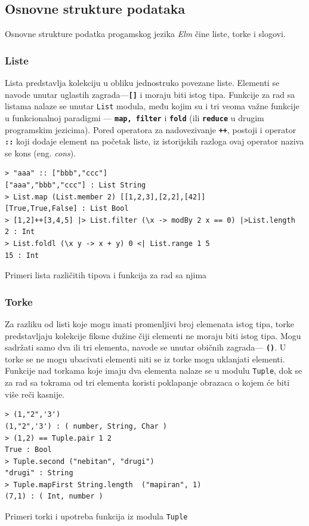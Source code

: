 \documentclass[12pt,oneside]{memoir}
\begin{document}
\subsection{Osnovne strukture podataka}
Osnovne strukture podatka progamskog jezika \emph{Elm} čine liste, torke i slogovi. 
\subsubsection{Liste}
Lista predstavlja kolekciju u obliku jednostruko povezane liste. Elementi se navode
unutar uglastih zagrada---\textbf{\texttt{[\smallskip ]}} i moraju biti istog tipa. Funkcije za rad
sa listama nalaze se unutar \texttt{List} modula, među kojim su i tri veoma važne funkcije 
u funkcionalnoj paradigmi --- \textbf{\texttt{map, filter}} i \textbf{\texttt{fold}} (ili
\textbf{\texttt{reduce}} u drugim programskim jezicima).
Pored operatora za nadovezivanje \textbf{\texttt{++}}, postoji i operator \textbf{\texttt{::}} koji
dodaje element na početak liste, iz istorijskih razloga ovaj operator naziva se kons
(eng. \emph{cons}). 
\begin{listing}[h]
\begin{verbatim}
> "aaa" :: ["bbb","ccc"]
["aaa","bbb","ccc"] : List String
> List.map (List.member 2) [[1,2,3],[2,2],[42]]
[True,True,False] : List Bool
> [1,2]++[3,4,5] |> List.filter (\x -> modBy 2 x == 0) |>List.length
2 : Int
> List.foldl (\x y -> x + y) 0 <| List.range 1 5 
15 : Int
\end{verbatim}
\caption{Primeri lista različitih tipova i funkcija za rad sa njima}
\label{listing:liste}
\end{listing}
\subsubsection{Torke}
Za razliku od listi koje mogu imati promenljivi broj elemenata istog tipa, torke
predstavljaju kolekcije fiksne dužine čiji elementi ne moraju biti istog tipa.
Mogu sadržati samo dva ili tri elementa, navode se unutar običnih zagrada---
\textbf{\texttt{()}}. U torke se ne mogu ubacivati elementi niti se iz torke mogu
uklanjati elementi. Funkcije nad torkama koje imaju dva elementa nalaze se u modulu
\texttt{Tuple}, dok se za rad sa tokrama od tri elementa koristi poklapanje obrazaca
o kojem će biti više reči kasnije.
\begin{listing}[h]
\begin{verbatim}
> (1,"2",'3')
(1,"2",'3') : ( number, String, Char )
> (1,2) == Tuple.pair 1 2
True : Bool
> Tuple.second ("nebitan", "drugi")
"drugi" : String
> Tuple.mapFirst String.length  ("mapiran", 1)
(7,1) : ( Int, number )
\end{verbatim}
\caption{Primeri torki i upotreba funkcija iz modula \texttt{Tuple}}
\label{listing:torke}
\end{listing}
\end{document}
